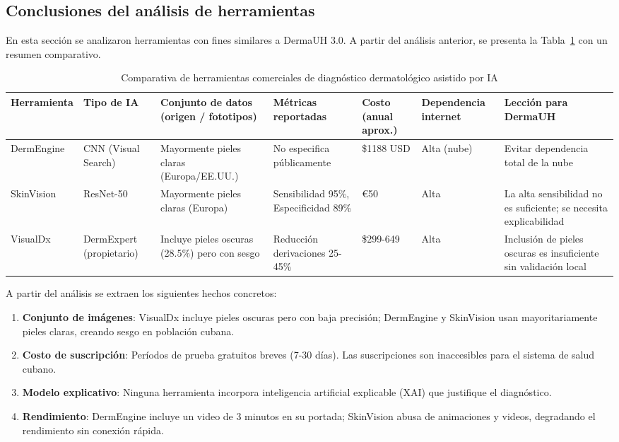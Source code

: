 \subsection{Conclusiones del análisis de herramientas}

En esta sección se analizaron herramientas con fines similares a DermaUH 3.0. A partir del análisis anterior, se presenta la Tabla~\ref{tab:comparativa_herramientas} con un resumen comparativo.

\begin{table}[ht]
    \centering
    \footnotesize
    \caption{Comparativa de herramientas comerciales de diagnóstico dermatológico asistido por IA}
    \label{tab:comparativa_herramientas}
    \begin{tabularx}{\textwidth}{|>{\raggedright\arraybackslash}X|>{\raggedright\arraybackslash}X|>{\raggedright\arraybackslash}X|>{\raggedright\arraybackslash}X|>{\raggedright\arraybackslash}X|>{\raggedright\arraybackslash}X|>{\raggedright\arraybackslash}X|}
        \hline
        \textbf{Herramienta} & \textbf{Tipo de IA} & \textbf{Conjunto de datos (origen / fototipos)} & \textbf{Métricas reportadas} & \textbf{Costo (anual aprox.)} & \textbf{Dependencia internet} & \textbf{Lección para DermaUH} \\
        \hline
        DermEngine & CNN (Visual Search) & Mayormente pieles claras (Europa/EE.UU.) & No especifica públicamente & \$1188 USD & Alta (nube) & Evitar dependencia total de la nube \\
        \hline
        SkinVision & ResNet-50 & Mayormente pieles claras (Europa) & Sensibilidad 95\%, Especificidad 89\% & €50 & Alta & La alta sensibilidad no es suficiente; se necesita explicabilidad \\
        \hline
        VisualDx & DermExpert (propietario) & Incluye pieles oscuras (28.5\%) pero con sesgo & Reducción derivaciones 25-45\% & \$299-649 & Alta & Inclusión de pieles oscuras es insuficiente sin validación local \\
        \hline
    \end{tabularx}
\end{table}

A partir del análisis se extraen los siguientes hechos concretos:

\begin{enumerate}
    \item \textbf{Conjunto de imágenes}: VisualDx incluye pieles oscuras pero con baja precisión; DermEngine y SkinVision usan mayoritariamente pieles claras, creando sesgo en población cubana.
    \item \textbf{Costo de suscripción}: Períodos de prueba gratuitos breves (7-30 días). Las suscripciones son inaccesibles para el sistema de salud cubano.
    \item \textbf{Modelo explicativo}: Ninguna herramienta incorpora inteligencia artificial explicable (XAI) que justifique el diagnóstico.
    \item \textbf{Rendimiento}: DermEngine incluye un video de 3 minutos en su portada; SkinVision abusa de animaciones y videos, degradando el rendimiento sin conexión rápida.
\end{enumerate}

